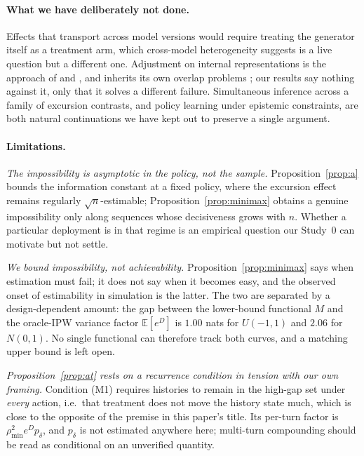 \documentclass[11pt]{article}
\theoremstyle{definition}
\theoremstyle{remark}
\newcommand{\E}{\mathbb{E}}
\begin{document}
\paragraph{What we have deliberately not done.} Effects that transport
across model versions would require treating the generator itself as a
treatment arm, which cross-model heterogeneity suggests is a live question
\citep{chen2026benchmarking} but a different one. Adjustment on internal
representations is the approach of \citet{imai2026causal} and
\citet{nakamura2026dynamic}, and inherits its own overlap problems
\citep{tierney2025design}; our results say nothing against it, only that it
solves a different failure. Simultaneous inference across a family of
excursion contrasts, and policy learning under epistemic constraints, are
both natural continuations we have kept out to preserve a single argument.

\paragraph{Limitations.}
\emph{The impossibility is asymptotic in the policy, not the sample.}
Proposition~\ref{prop:a} bounds the information constant at a fixed policy,
where the excursion effect remains regularly $\sqrt{n}$-estimable;
Proposition~\ref{prop:minimax} obtains a genuine impossibility only along
sequences whose decisiveness grows with $n$. Whether a particular deployment
is in that regime is an empirical question our Study~0 can motivate but not
settle.

\emph{We bound impossibility, not achievability.}
Proposition~\ref{prop:minimax} says when estimation must fail; it does not
say when it becomes easy, and the observed onset of estimability in
simulation is the latter. The two are separated by a design-dependent
amount: the gap between the lower-bound functional $M$ and the oracle-IPW
variance factor $\E[e^{D}]$ is $1.00$ nats for $U(-1,1)$ and $2.06$ for
$N(0,1)$. No single functional can therefore track both curves, and a
matching upper bound is left open.

\emph{Proposition~\ref{prop:at} rests on a recurrence condition in tension with our
own framing.} Condition (M1) requires histories to remain in the high-gap
set under \emph{every} action, i.e.\ that treatment does not move the
history state much, which is close to the opposite of the premise in this
paper's title. Its per-turn factor is $\rho_{\min}^2 e^{D} p_\delta$, and
$p_\delta$ is not estimated anywhere here; multi-turn compounding should be
read as conditional on an unverified quantity.
\end{document}
